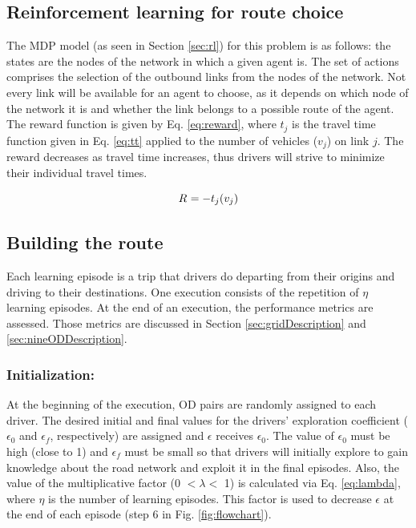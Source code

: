 \documentclass{RITA}
\newcommand{\travTime}{\ensuremath{t_j}} 	%
\newcommand{\veh}{\ensuremath{v}}		%
\newcommand{\reward}[1][]{\ensuremath{R_#1}}	%
\newcommand{\numepis}{\ensuremath{\eta}}	%
\begin{document}
\subsection{Reinforcement learning for route choice}

The MDP model (as seen in Section \ref{sec:rl}) for this problem is as follows: the states are the nodes of the  network in which a given agent is. The set of actions comprises the selection of the outbound links from the nodes of the network. Not every link will be available for an agent to choose, as it depends on which node of the network it is and whether the link belongs to a possible route of the agent. The reward function is given by Eq. \eqref{eq:reward}, where $\travTime$ is the travel time function given in Eq. \eqref{eq:tt} applied to the number of vehicles ($\veh_j$) on link $j$. The reward decreases as travel time increases, thus drivers will strive to minimize their individual travel times.

\begin{equation}
\label{eq:reward}
\reward{} = - \travTime(\veh_j)
\end{equation}

\subsection{Building the route}

Each learning episode is a trip that drivers do departing from their origins and driving to their destinations. One execution consists of the repetition of $\numepis$ learning episodes. At the end of an execution, the performance metrics are assessed. Those metrics are discussed in Section \ref{sec:gridDescription} and \ref{sec:nineODDescription}.

\subsubsection{Initialization:}
At the beginning of the execution, OD pairs are randomly assigned to each driver. The desired initial and final values for the drivers' exploration coefficient ($\epsilon_0$ and $\epsilon_f$, respectively) are assigned and $\epsilon$ receives $\epsilon_0$. The value of $\epsilon_0$ must be high (close to 1) and $\epsilon_f$ must be small so that drivers will initially explore to gain knowledge about the road network and exploit it in the final episodes. Also, the value of the multiplicative factor (0 $< \lambda <$ 1) is calculated via Eq. \eqref{eq:lambda}, where $\numepis$ is the number of learning episodes. This factor is used to decrease $\epsilon$ at the end of each episode (step 6 in Fig. \ref{fig:flowchart}).
\end{document}
